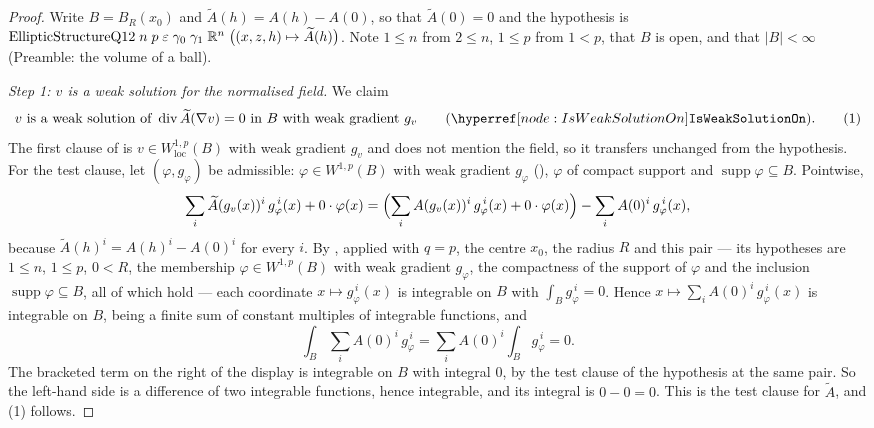 \begin{proof}
Write $B=B_R(x_0)$ and $\widetilde A(h)=A(h)-A(0)$, so that $\widetilde A(0)=0$
and the hypothesis is
$\mathrm{EllipticStructureQ12}\;n\;p\;\varepsilon\;\gamma_0\;\gamma_1\;\mathbb{R}^n\;
\bigl((x,z,h)\mapsto\widetilde A(h)\bigr)$.  Note $1\le n$ from $2\le n$,
$1\le p$ from $1<p$, that $B$ is open, and that $|B|<\infty$ (Preamble: the
volume of a ball).

\emph{Step 1: $v$ is a weak solution for the normalised field.}  We claim
\[
v\ \text{is a weak solution of}\ \operatorname{div}\widetilde A(\nabla v)=0\
\text{in}\ B\ \text{with weak gradient}\ g_v
\qquad(\noderef{IsWeakSolutionOn}).
\tag{1}
\]
The first clause of  is
$v\in W^{1,p}_{\mathrm{loc}}(B)$ with weak gradient $g_v$ and does not mention
the field, so it transfers unchanged from the hypothesis.  For the test clause,
let $(\varphi,g_\varphi)$ be admissible: $\varphi\in W^{1,p}(B)$ with weak
gradient $g_\varphi$ (\noderef{MemW1pOn}), $\varphi$ of compact support and
$\operatorname{supp}\varphi\subseteq B$.  Pointwise,
\[
\sum_i\widetilde A(g_v(x))^i\,g_\varphi^{\,i}(x)+0\cdot\varphi(x)
=\Bigl(\sum_iA(g_v(x))^i\,g_\varphi^{\,i}(x)+0\cdot\varphi(x)\Bigr)
-\sum_iA(0)^i\,g_\varphi^{\,i}(x),
\]
because $\widetilde A(h)^i=A(h)^i-A(0)^i$ for every $i$.  By
, applied with $q=p$, the centre
$x_0$, the radius $R$ and this pair --- its hypotheses are $1\le n$, $1\le p$,
$0<R$, the membership $\varphi\in W^{1,p}(B)$ with weak gradient $g_\varphi$,
the compactness of the support of $\varphi$ and the inclusion
$\operatorname{supp}\varphi\subseteq B$, all of which hold --- each coordinate
$x\mapsto g_\varphi^{\,i}(x)$ is integrable on $B$ with
$\int_Bg_\varphi^{\,i}=0$.  Hence $x\mapsto\sum_iA(0)^i\,g_\varphi^{\,i}(x)$ is
integrable on $B$, being a finite sum of constant multiples of integrable
functions, and
\[
\int_B\sum_iA(0)^i\,g_\varphi^{\,i}
=\sum_iA(0)^i\int_Bg_\varphi^{\,i}=0 .
\]
The bracketed term on the right of the display is integrable on $B$ with
integral $0$, by the test clause of the hypothesis at the same pair.  So the
left-hand side is a difference of two integrable functions, hence integrable,
and its integral is $0-0=0$.  This is the test clause for $\widetilde A$, and
(1) follows.


\end{proof}
